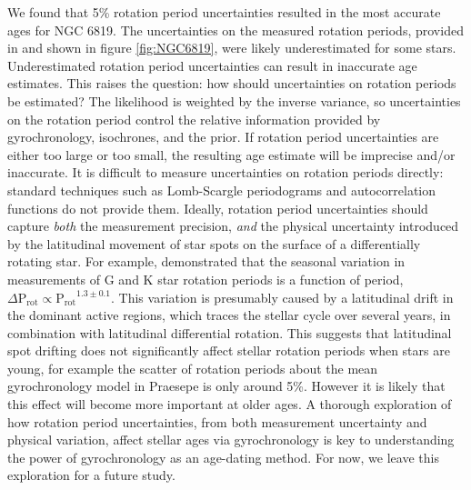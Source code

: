 \documentclass[useAMS, usenatbib, preprint, 12pt]{aastex}
\newcommand{\racomment}[1]{{\bf #1}}
\begin{document}
We found that 5\% rotation period uncertainties resulted in the most accurate
ages for NGC 6819.
The uncertainties on the measured rotation periods, provided in
\citet{meibom2015} and shown in figure \ref{fig:NGC6819}, were likely
underestimated for some stars.
Underestimated rotation period uncertainties can result in inaccurate age
estimates.
This raises the question: how should uncertainties on rotation periods be
estimated?
The likelihood is weighted by the inverse variance, so uncertainties on the
rotation period control the relative information provided by gyrochronology,
isochrones, and the prior.
If rotation period uncertainties are either too large or too small, the
resulting age estimate will be imprecise and/or inaccurate.
It is difficult to measure uncertainties on rotation periods directly:
standard techniques such as Lomb-Scargle periodograms and autocorrelation
functions do not provide them.
    Ideally, rotation period uncertainties should capture {\it both} the
measurement precision, {\it and} the physical uncertainty introduced by the
latitudinal movement of star spots on the surface of a differentially rotating
star.
For example, \citet{donahue1996} demonstrated that the seasonal variation in
measurements of G and K star rotation periods is a function of period, $\Delta
\mathrm{P_{rot}} \propto \mathrm{P_{rot}}^{1.3\pm0.1}$.
This variation is presumably caused by a latitudinal drift in the dominant
active regions, which traces the stellar cycle over several years, in
combination with latitudinal differential rotation.
This suggests that latitudinal spot drifting does not significantly
affect stellar rotation periods when stars are young, for example the scatter
of rotation periods about the mean gyrochronology model in Praesepe is only
around 5\%.
However it is likely that this effect will become more important at older
ages.
A thorough exploration of how rotation period uncertainties, from both
measurement uncertainty and physical variation, affect stellar ages via
gyrochronology is key to understanding the power of gyrochronology as an
age-dating method.
For now, we leave this exploration for a future study.
\end{document}
